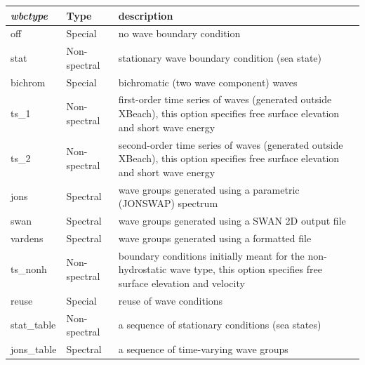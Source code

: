 \documentclass{article}
\begin{document}
\begin{tabular}{|p{0.7in}|p{0.8in}|p{2.6in}|} \hline 
\textit{wbctype} & Type & description \\ \hline 
off & Special & no wave boundary condition \\ \hline 
stat & Non-spectral & stationary wave boundary condition (sea state) \\ \hline 
bichrom & Special & bichromatic (two wave component) waves \\ \hline 
ts\_1 & Non-spectral & first-order time series of waves (generated outside XBeach), this option specifies free surface elevation and short wave energy \\ \hline 
ts\_2 & Non-spectral & second-order time series of waves (generated outside XBeach), this option specifies free surface elevation and short wave energy \\ \hline 
jons & Spectral & wave groups generated using a parametric (JONSWAP) spectrum \\ \hline 
swan & Spectral & wave groups generated using a SWAN 2D output file \\ \hline 
vardens & Spectral & wave groups generated using a formatted file \\ \hline 
ts\_nonh & Non-spectral & boundary conditions initially meant for the non-hydrostatic wave type, this option specifies free surface elevation and velocity \\ \hline 
reuse & Special & reuse of wave conditions \\ \hline 
stat\_table & Non-spectral & a sequence of stationary conditions (sea states) \\ \hline 
jons\_table & Spectral & a sequence of time-varying wave groups \\ \hline 
\end{tabular}



\noindent \eject 
\end{document}
